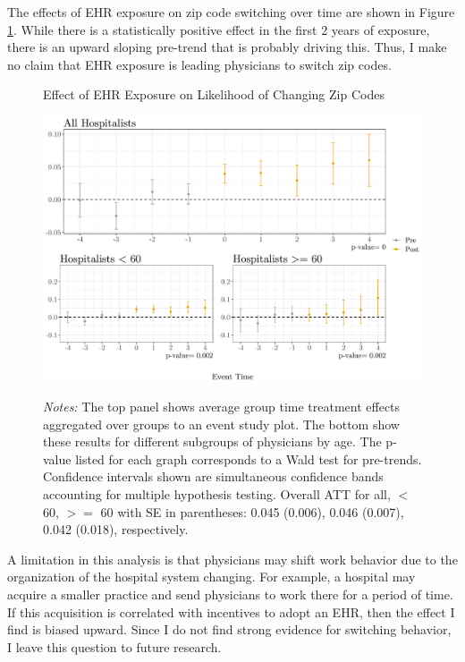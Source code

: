 \documentclass[11pt]{article}
\begin{document}
The effects of EHR exposure on zip code switching over time are shown in Figure \ref{fig:zip}. While there is a statistically positive effect in the first 2 years of exposure, there is an upward sloping pre-trend that is probably driving this. Thus, I make no claim that EHR exposure is leading physicians to switch zip codes.

\begin{figure}[ht]
    \centering
    \captionsetup{width=.85\linewidth}
    \caption{Effect of EHR Exposure on Likelihood of Changing Zip Codes}
    \includegraphics[scale=.65]{Objects/zip_plot.pdf}
    \label{fig:zip}
    \vspace{2mm}
    \caption*{\footnotesize{\textit{Notes:} The top panel shows average group time treatment effects aggregated over groups to an event study plot. The bottom show these results for different subgroups of physicians by age. The p-value listed for each graph corresponds to a Wald test for pre-trends. Confidence intervals shown are simultaneous confidence bands accounting for multiple hypothesis testing. Overall ATT for all, $<$ 60, $>=$ 60 with SE in parentheses: 0.045 (0.006), 0.046 (0.007), 0.042 (0.018), respectively.}}
\end{figure}

A limitation in this analysis is that physicians may shift work behavior due to the organization of the hospital system changing. For example, a hospital may acquire a smaller practice and send physicians to work there for a period of time. If this acquisition is correlated with incentives to adopt an EHR, then the effect I find is biased upward. Since I do not find strong evidence for switching behavior, I leave this question to future research.
\end{document}
